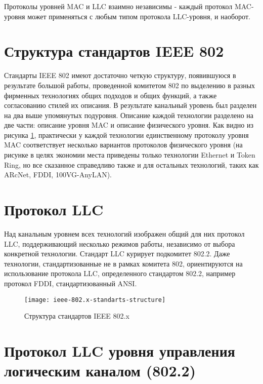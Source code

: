 Протоколы уровней MAC и LLC взаимно независимы - каждый протокол MAC-уровня может применяться с любым типом протокола LLC-уровня, и наоборот.

\section{Структура стандартов IEEE 802}

Стандарты IEEE 802 имеют достаточно четкую структуру, появившуюся в результате большой работы, проведенной комитетом 802 по выделению в разных фирменных технологиях общих подходов и общих функций, а также согласованию стилей их описания.
В результате канальный уровень был разделен на два выше упомянутых подуровня.
Описание каждой технологии разделено на две части: описание уровня MAC и описание физического уровня.
Как видно из рисунка \ref{fig:ieee-802.x-standarts-structure}, практически у каждой технологии единственному протоколу уровня MAC соответствует несколько вариантов протоколов физического уровня (на рисунке в целях экономии места приведены только технологии Ethernet и Token Ring, но все сказанное справедливо также и для остальных технологий, таких как ARcNet, FDDI, 100VG-AnyLAN).

\section{Протокол LLC}

Над канальным уровнем всех технологий изображен общий для них протокол LLC, поддерживающий несколько режимов работы, независимо от выбора конкретной технологии.
Стандарт LLC курирует подкомитет 802.2.
Даже технологии, стандартизованные не в рамках комитета 802, ориентируются на использование протокола LLC, определенного стандартом 802.2, например протокол FDDI, стандартизованный ANSI.

\begin{figure}[!ht]
    \centering
    \texttt{[image: ieee-802.x-standarts-structure]}
    \caption{Структура стандартов IEEE 802.x}
    \label{fig:ieee-802.x-standarts-structure}
\end{figure}

\section{Протокол LLC уровня управления логическим каналом (802.2)}

